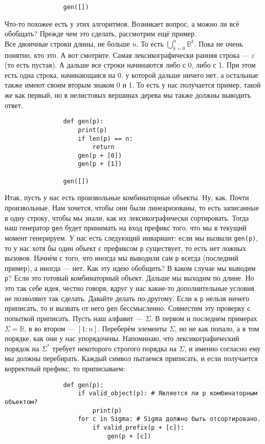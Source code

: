 \documentclass{article}
\begin{document}
\begin{itemize}
\begin{Comment}
\begin{verbatim}
                gen([])
            \end{verbatim}
            Что-то похожее есть у этих алгоритмов. Возникает вопрос, а можно ли всё обобщать? Прежде чем это сделать, рассмотрим ещё пример.\\
            Все двоичные строки длины, не больше $n$. То есть $\bigcup\limits_{k=0}^n\mathbb B^k$. Пока не очень понятно, кто это. А вот смотрите. Самая лексикографически ранняя строка --- $\varepsilon$ (то есть пустая). А дальше все строки начинаются либо с 0, либо с 1. При этом есть одна строка, начинающаяся на 0, у которой дальше ничего нет, а остальные также имеют своим вторым знаком 0 и 1. То есть у нас получается пример, такой же как первый, но в нелистовых вершинах дерева мы также должны выводить ответ.
            \begin{verbatim}
                def gen(p):
                    print(p)
                    if len(p) == n:
                        return
                    gen(p + [0])
                    gen(p + [1])
                
                gen([])
            \end{verbatim}
            Итак, пусть у нас есть произвольные комбинаторные объекты. Ну, как. Почти произвольные. Нам хочется, чтобы они были линеаризованы, то есть записанные в одну строку, чтобы мы знали, как их лексикографически сортировать. Тогда наш генератор \texttt{gen} будет принимать на вход префикс того, что мы в текущий момент генерируем. У нас есть следующий инвариант: если мы вызвали \texttt{gen(p)}, то у нас хотя бы один объект с префиксом \texttt{p} существует, то есть нет ложных вызовов. Начнём с того, что иногда мы выводили сам \texttt{p} всегда (последний пример), а иногда --- нет. Как эту идею обобщить? В каком случае мы выводим \texttt{p}? Если это готовый комбинаторный объект. Дальше мы выходим по длине. Но это так себе идея, честно говоря, вдруг у нас какие-то дополнительные условия не позволяют так сделать. Давайте делать по-другому. Если к \texttt{p} нельзя ничего приписать, то и вызвать от него \texttt{gen} бессмысленно. Совместим эту проверку с попыткой приписать. Пусть наш алфавит --- $\Sigma$. В первом и последнем примерах $\Sigma=\mathbb B$, в во втором --- $[1:n]$. Переберём элементы $\Sigma$, но не как попало, а в том порядке, как они у нас упорядочены. Напоминаю, что лексикографический порядок на $\Sigma^*$ требует некоторого строгого порядка на $\Sigma$, и именно согласно ему мы должны перебирать. Каждый символ пытаемся приписать, и если получается корректный префикс, то приписываем:
            \begin{verbatim}
                def gen(p):
                    if valid_object(p): # Является ли p комбинаторным объектом?
                        print(p)
                    for c in Sigma: # Sigma должно быть отсортировано.
                        if valid_prefix(p + [c]):
                            gen(p + [c])
                

\end{verbatim}
\end{Comment}
\end{itemize}
\end{document}
